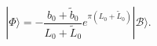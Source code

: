 \begin{equation} %
  |\Phi\rangle = -\frac{b_0 + \tilde{b}_0}{L_0+\tilde{L}_0}
   e^{ \pi (L_0 +\tilde{L}_0)} |\mathcal{B}
\rangle.
\end{equation} 
